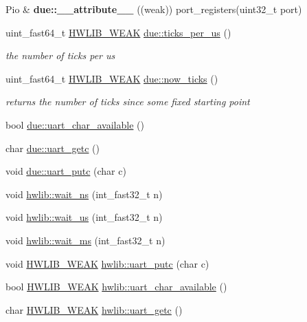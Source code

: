 \begin{DoxyCompactItemize}
\item 
\mbox{\label{namespacedue_a13c9d311278ec150daa2a17a0f0c2fd2}} 
Pio \& {\bfseries due\+::\+\_\+\+\_\+attribute\+\_\+\+\_\+} ((weak)) port\+\_\+registers(uint32\+\_\+t port)
\item 
uint\+\_\+fast64\+\_\+t \hyperlink{hwlib-defines_8hpp_a04be4340016df60d6636c1d1c6d94fc9}{H\+W\+L\+I\+B\+\_\+\+W\+E\+AK} \hyperlink{namespacedue_aa7b4a4a4dffe3296d13e465cc3d78a62}{due\+::ticks\+\_\+per\+\_\+us} ()
\begin{DoxyCompactList}\small\item\em the number of ticks per us \end{DoxyCompactList}\item 
uint\+\_\+fast64\+\_\+t \hyperlink{hwlib-defines_8hpp_a04be4340016df60d6636c1d1c6d94fc9}{H\+W\+L\+I\+B\+\_\+\+W\+E\+AK} \hyperlink{namespacedue_a686106c53be24f799ee7313069a678be}{due\+::now\+\_\+ticks} ()
\begin{DoxyCompactList}\small\item\em returns the number of ticks since some fixed starting point \end{DoxyCompactList}\item 
bool \hyperlink{namespacedue_a3fb7cef33e032624d26b3a94f09974d1}{due\+::uart\+\_\+char\+\_\+available} ()
\item 
char \hyperlink{namespacedue_aaac909e6a73b4a5ed65230aad135c277}{due\+::uart\+\_\+getc} ()
\item 
void \hyperlink{namespacedue_a4a5e5e08f37cad92092942e5b8898471}{due\+::uart\+\_\+putc} (char c)
\item 
void \hyperlink{namespacehwlib_a9c01a1d0319f5eadd8926e66aea19aa0}{hwlib\+::wait\+\_\+ns} (int\+\_\+fast32\+\_\+t n)
\item 
void \hyperlink{namespacehwlib_a0096b739fc566c896366ecbd3113cc1e}{hwlib\+::wait\+\_\+us} (int\+\_\+fast32\+\_\+t n)
\item 
void \hyperlink{namespacehwlib_a6119aa5d3034176aa1515ef4bb193044}{hwlib\+::wait\+\_\+ms} (int\+\_\+fast32\+\_\+t n)
\item 
void \hyperlink{hwlib-defines_8hpp_a04be4340016df60d6636c1d1c6d94fc9}{H\+W\+L\+I\+B\+\_\+\+W\+E\+AK} \hyperlink{namespacehwlib_ae568ebef4b8d8a77cecae8cea595896f}{hwlib\+::uart\+\_\+putc} (char c)
\item 
bool \hyperlink{hwlib-defines_8hpp_a04be4340016df60d6636c1d1c6d94fc9}{H\+W\+L\+I\+B\+\_\+\+W\+E\+AK} \hyperlink{namespacehwlib_aaf31868f62815d2e405ad90469ae50a5}{hwlib\+::uart\+\_\+char\+\_\+available} ()
\item 
char \hyperlink{hwlib-defines_8hpp_a04be4340016df60d6636c1d1c6d94fc9}{H\+W\+L\+I\+B\+\_\+\+W\+E\+AK} \hyperlink{namespacehwlib_aa5ee60a7ff11cc49aba41f8be7f08a67}{hwlib\+::uart\+\_\+getc} ()
\end{DoxyCompactItemize}
